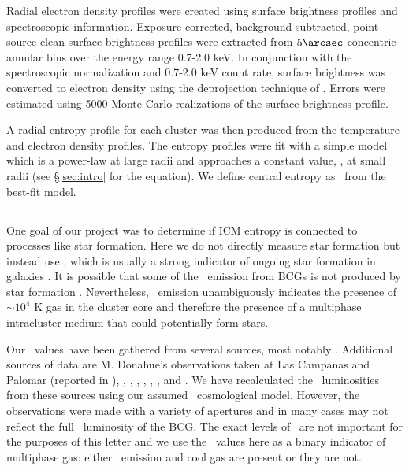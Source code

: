 \documentclass{emulateapj}
\begin{document}
Radial electron density profiles were created using surface brightness
profiles and spectroscopic information. Exposure-corrected,
background-subtracted, point-source-clean surface brightness profiles
were extracted from $5\arcsec$ concentric annular bins over the energy
range 0.7-2.0 keV. In conjunction with the spectroscopic normalization
and 0.7-2.0 keV count rate, surface brightness was converted to
electron density using the deprojection technique of
\cite{kriss83}. Errors were estimated using 5000 Monte Carlo
realizations of the surface brightness profile.

A radial entropy profile for each cluster was then produced from the
temperature and electron density profiles. The entropy profiles were
fit with a simple model which is a power-law at large radii and
approaches a constant value, \kna, at small radii (see
\S\ref{sec:intro} for the equation). We define central entropy as
\kna\ from the best-fit model.

\subsection{\halpha}
\label{sec:ha}

One goal of our project was to determine if ICM entropy is connected
to processes like star formation. Here we do not directly measure star
formation but instead use \halpha, which is usually a strong indicator
of ongoing star formation in galaxies \citep{kennicuttrelation}. It is
possible that some of the \halpha\ emission from BCGs is not produced
by star formation \citep{begelman90, sparks04, rusz08,
 ferland08}. Nevertheless, \halpha\ emission unambiguously indicates
the presence of $\sim 10^4$ K gas in the cluster core and therefore
the presence of a multiphase intracluster medium that could
potentially form stars.

Our \halpha\ values have been gathered from several sources, most
notably \cite{crawford99}. Additional sources of data are M. Donahue's
observations taken at Las Campanas and Palomar (reported in
\citealt{accept}), \cite{heckman89}, \cite{dsg92}, \cite{lawrence96},
\cite{1996AJ....112.1390V}, \cite{white97},
\cite{2005MNRAS.363..216C}, and \cite{quillen08}. We have recalculated
the \halpha\ luminosities from these sources using our assumed
\LCDM\ cosmological model.  However, the observations were made with a
variety of apertures and in many cases may not reflect the full
\halpha\ luminosity of the BCG. The exact levels of \lha\ are not
important for the purposes of this letter and we use the \lha\ values
here as a binary indicator of multiphase gas: either \halpha\ emission
and cool gas are present or they are not.
\end{document}
